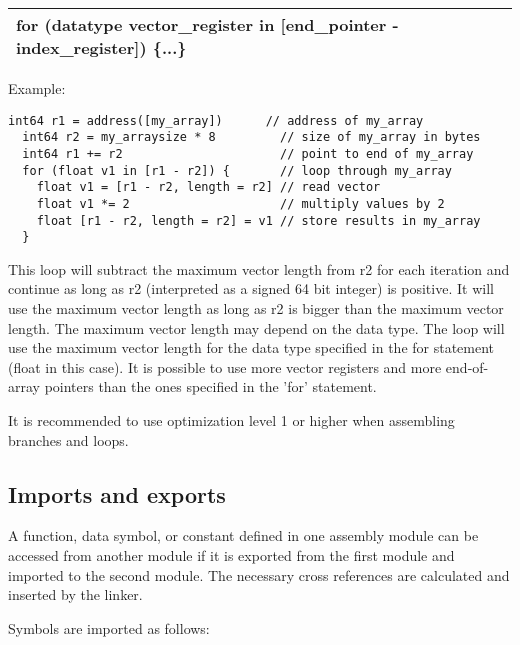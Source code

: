\documentclass[forwardcom.tex]{subfiles}
\begin{document}
\begin{tabular}{|p{150mm}|}
\hline
\hspace{4mm} for (datatype vector\_register in [end\_pointer - index\_register]) \{...\}\\
\hline
\end{tabular}
\vspace{4mm}

Example:
\vspace{2mm}

\begin{lstlisting}[frame=single]
  int64 r1 = address([my_array])      // address of my_array
  int64 r2 = my_arraysize * 8         // size of my_array in bytes
  int64 r1 += r2                      // point to end of my_array
  for (float v1 in [r1 - r2]) {       // loop through my_array
    float v1 = [r1 - r2, length = r2] // read vector
    float v1 *= 2                     // multiply values by 2
    float [r1 - r2, length = r2] = v1 // store results in my_array
  }
\end{lstlisting}
\vspace{2mm}

This loop will subtract the maximum vector length from r2 for each iteration and continue as long as r2 (interpreted as a signed 64 bit integer) is positive. It will use the maximum vector length as long as r2 is bigger than the maximum vector length.
The maximum vector length may depend on the data type. The loop will use the maximum vector length for the data type specified in the for statement (float in this case). It is possible to use more vector registers and more end-of-array pointers than the ones specified in the 'for' statement.
\vspace{2mm}

It is recommended to use optimization level 1 or higher when assembling branches and loops.
\vspace{2mm}


\subsection{Imports and exports} \label{assemblyImportExport}
A function, data symbol, or constant defined in one assembly module can be accessed from another module if it is exported from the first module and imported to the second module. The necessary cross references are calculated and inserted by the linker.
\vspace{2mm}

Symbols are imported as follows:
\vspace{2mm}
\end{document}
